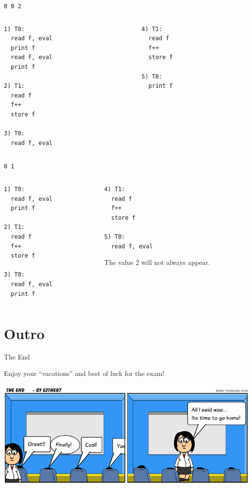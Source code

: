 \begin{frame}[fragile]{\lstinline{0 0 2}}
  \begin{columns}[t]
    \begin{column}{0.5\textwidth}
  \begin{lstlisting}
1) T0:
  read f, eval 
  print f
  read f, eval
  print f

2) T1: 
  read f
  f++
  store f

3) T0: 
  read f, eval
  \end{lstlisting}
    \end{column}
    \begin{column}{0.5\textwidth}
  \begin{lstlisting}
4) T1:
  read f
  f++
  store f

5) T0:
  print f
  \end{lstlisting}
    \end{column}
  \end{columns}
\end{frame}

\begin{frame}[fragile]{\lstinline{0 1}}
  \begin{columns}[t]
    \begin{column}{0.5\textwidth}
  \begin{lstlisting}
1) T0:
  read f, eval 
  print f

2) T1: 
  read f
  f++
  store f

3) T0: 
  read f, eval
  print f
  \end{lstlisting}
    \end{column}
    \begin{column}{0.5\textwidth}
  \begin{lstlisting}
4) T1:
  read f
  f++
  store f

5) T0:
  read f, eval
  \end{lstlisting}

  The value 2 will not always appear.
    \end{column}
  \end{columns}
\end{frame}


\section*{Outro}

\begin{frame}{The End}
  \begin{center}
    \huge{Enjoy your ``vacations'' and best of luck for the exam!}
  \end{center}


  \begin{center}
    \includegraphics[scale=0.3]{figures/the-end}
  \end{center}
\end{frame}



